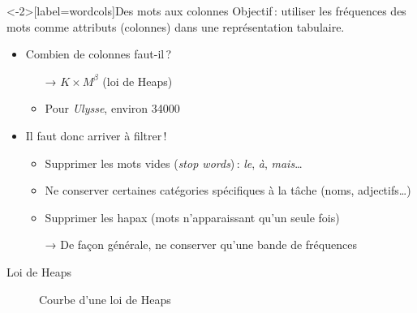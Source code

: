 \documentclass[xcolor={svgnames}, french]{beamer}
\begin{document}
\begin{frame}<-2>[label=wordcols]{Des mots aux colonnes}
	Objectif : utiliser les \alert{fréquences} des mots comme attributs (colonnes) dans une représentation tabulaire.
	\pause
	\begin{itemize}
		\item<+-> Combien de colonnes faut-il ?
			\pause
			\begin{itemize}
				\item[→] $K×M^β$ (loi de Heaps)
				\item Pour \emph{Ulysse}, environ \num{34000}
			\end{itemize}
		\item<+-> Il faut donc arriver à filtrer !
			\begin{itemize}[<+->]
				\item Supprimer les \alert{mots vides} (\emph{stop words}) : \emph{le}, \emph{à}, \emph{mais}…
				\item Ne conserver certaines catégories spécifiques à la tâche (noms, adjectifs…)
				\item Supprimer les \alert{hapax} (mots n'apparaissant qu'un seule fois)
				\item[→] De façon générale, ne conserver qu'une \alert{bande de fréquences}
			\end{itemize}
	\end{itemize}
\end{frame}

\begin{frame}{Loi de Heaps}
	\begin{figure}
		\tikzset{external/export=true}
		\caption{Courbe d'une loi de Heaps}
	\end{figure}
\end{frame}

\end{document}
